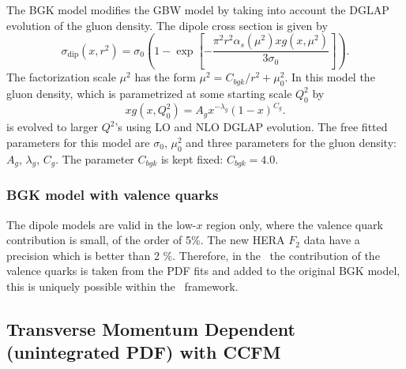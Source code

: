 The BGK model modifies the GBW model by taking into account the  DGLAP evolution
of the gluon density. 
The dipole cross section is given by
\begin{equation*}
\label{eBGK}
   \sigma_{\text{dip}}(x,r^{2}) = \sigma_{0} 
\left(1 - \exp \left[-\frac{\pi^{2} r^{2} \alpha_{s}(\mu^{2}) xg(x,\mu^{2})}{3 \sigma_{0}} \right]\right).
\end{equation*}
The factorization scale $\mu^{2}$ has the form $\mu^{2} = C_{bgk}/r^{2}+\mu^{2}_{0}$.
In this model the gluon density, which  is parametrized  at some starting scale $Q_{0}^{2}$ by
\begin{equation*}
\label{eqTH730}
   xg(x,Q^{2}_{0}) = A_{g} x^{-\lambda_{g}}(1-x)^{C_{g}}.
\end{equation*}
is evolved to larger $Q^2$'s using LO and NLO DGLAP evolution.
The free fitted parameters for this model are $\sigma_{0}$, $\mu^{2}_{0}$ and three parameters for the gluon density: $A_{g}$, $\lambda_{g}$, $C_{g}$. The parameter $C_{bgk}$ is kept fixed: $C_{bgk} = 4.0$. 

\subsubsection{BGK model with valence quarks}

The dipole models are valid in the low-$x$ region only, where the valence quark contribution is small, of the order of 5\%. The new HERA $F_2$ data have a precision which is  better than 2 \%. Therefore, in the \fitter\ the contribution of the valence quarks is taken from the PDF fits and added to the original 
BGK model, this is uniquely possible within the \fitter\ framework.

\subsection{Transverse Momentum Dependent (unintegrated PDF) with CCFM}

